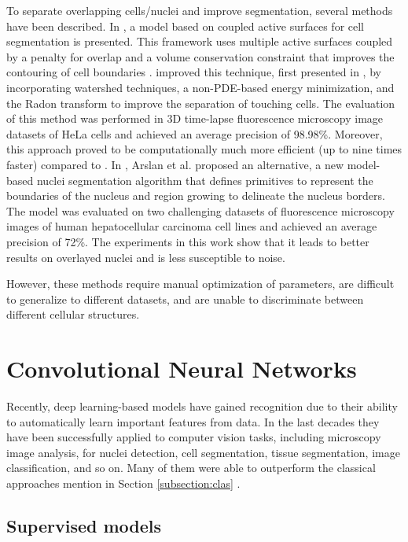 To separate overlapping cells/nuclei and improve segmentation, several methods have been described. In \cite{active:couple}, a model based on coupled active surfaces for cell segmentation is presented. This framework uses multiple active surfaces coupled by a penalty for overlap and a volume conservation constraint that improves the contouring of cell boundaries \cite{couple:original}. \citet{active:couple} improved this technique, first presented in \cite{couple:original}, by incorporating watershed techniques, a \ac{non-PDE}-based energy minimization, and the Radon transform to improve the separation of touching cells. The evaluation of this method was performed in \ac{3D} time-lapse fluorescence microscopy image datasets of HeLa cells and achieved an average precision of 98.98\%. Moreover, this approach proved to be computationally much more efficient (up to nine times faster) compared to \cite{couple:original}. In \cite{graphs}, Arslan et al. proposed an alternative, a new model-based nuclei segmentation algorithm that defines primitives to represent the boundaries of the nucleus and region growing to delineate the nucleus borders. The model was evaluated on two challenging datasets of fluorescence microscopy images of human hepatocellular carcinoma cell lines and achieved an average precision of 72\%. The experiments in this work show that it leads to better results on overlayed nuclei and is less susceptible to noise.

However, these methods require manual optimization of parameters, are difficult to generalize to different datasets, and are unable to discriminate between different cellular structures. 
 
\section{Convolutional Neural Networks}

Recently, deep learning-based models have gained recognition due to their ability to automatically learn important features from data. In the last decades they have been successfully applied to computer vision tasks, including microscopy image analysis, for nuclei detection, cell segmentation, tissue segmentation, image classification, and so on. Many of them were able to outperform the classical approaches mention in Section \ref{subsection:clas} \cite{review_cnn}.

\subsection{Supervised models}

